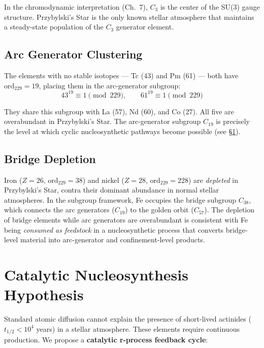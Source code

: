 In the chromodynamic interpretation (Ch.~7), $C_3$ is the center of the
SU(3) gauge structure. Przybylski's Star is the only known stellar
atmosphere that maintains a steady-state population of the $C_3$ generator element.

\subsection{Arc Generator Clustering}

The elements with no stable isotopes --- Tc (43) and Pm (61) --- both have
$\text{ord}_{229} = 19$, placing them in the arc-generator subgroup:
\begin{equation}
43^{19} \equiv 1 \pmod{229}, \qquad 61^{19} \equiv 1 \pmod{229}
\end{equation}

They share this subgroup with La (57), Nd (60), and Co (27). All five are
overabundant in Przybylski's Star. The arc-generator subgroup $C_{19}$
is precisely the level at which cyclic nucleosynthetic pathways become possible
(see \S\ref{sec:catalytic}).

\subsection{Bridge Depletion}

Iron ($Z = 26$, $\text{ord}_{229} = 38$) and nickel ($Z = 28$, $\text{ord}_{229} = 228$)
are \emph{depleted} in Przybylski's Star, contra their dominant abundance in
normal stellar atmospheres. In the subgroup framework, Fe occupies the bridge
subgroup $C_{38}$, which connects the arc generators ($C_{19}$) to the golden
orbit ($C_{57}$). The depletion of bridge elements while arc generators are
overabundant is consistent with Fe being \emph{consumed as feedstock} in a
nucleosynthetic process that converts bridge-level material into arc-generator
and confinement-level products.


\section{Catalytic Nucleosynthesis Hypothesis}
\label{sec:catalytic}

Standard atomic diffusion cannot explain the presence of short-lived actinides
($t_{1/2} < 10^4$ years) in a stellar atmosphere. These elements require
continuous production. We propose a \textbf{catalytic r-process feedback cycle}:

